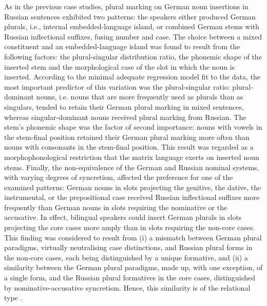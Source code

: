 As in the previous case studies, plural marking on German noun insertions in Russian sentences exhibited two patterns: the speakers either produced German plurals, i.e., internal embedded-language island, or combined German stems with Russian inflectional suffixes, fusing number and case. The choice between a mixed constituent and an embedded-language island was found to result from the following factors: the plural-singular distribution ratio, the phonemic shape of the inserted stem and the morphological case of the slot in which the noun is inserted. According to the minimal adequate regression model fit to the data, the most important predictor of this variation was the plural-singular ratio: plural-dominant nouns, i.e. nouns that are more frequently used as plurals than as singulars, tended to retain their German plural marking in mixed sentences, whereas singular-dominant nouns received plural marking from Russian. The stem's phonemic shape was the factor of second importance: nouns with vowels in the stem-final position retained their German plural marking more often than nouns with consonants in the stem-final position. This result was regarded as a morphophonological restriction that the matrix language exerts on inserted noun stems. Finally, the non-equivalence of the German and Russian nominal systems, with varying degrees of syncretism, affected the preference for one of the examined patterns: German nouns in slots projecting the genitive, the dative, the instrumental, or the prepositional case received Russian inflectional suffixes more frequently than German nouns in slots requiring the nominative or the accusative. In effect, bilingual speakers could insert German plurals in slots projecting the core cases more amply than in slots requiring the non-core cases. This finding was considered to result from (i) a mismatch between German plural paradigms, virtually neutralising case distinctions, and Russian plural forms in the non-core cases, each being distinguished by a unique formative, and (ii) a similarity between the German plural paradigms, made up, with one exception, of a single form, and the Russian plural formatives in the core cases, distinguished by nominative-accusative syncretism. Hence, this similarity is of the relational type \citep{gentner-markmann1997}. 

